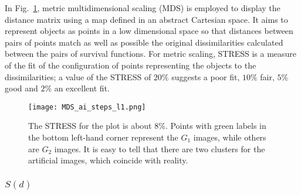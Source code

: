       
      In Fig.~\ref{fig:MDS_ai_steps_l1}, metric multidimensional
      scaling (MDS) \cite{borg2005modern} \cite{scikit-learn} is
      employed to display the distance matrix using a map defined in
      an abstract Cartesian space. It aims to represent objects as
      points in a low dimensional space so that distances between
      pairs of points match as well as possible the original
      dissimilarities calculated between the pairs of survival
      functions. For metric scaling, STRESS is a measure of the fit of
      the configuration of points representing the objects to the
      dissimilarities; a value of the STRESS of $20\%$ suggests a poor
      fit, $10\%$ fair, $5\%$ good and $2\%$ an excellent fit.

      \begin{figure}
        \centering
        \texttt{[image: MDS\_ai\_steps\_l1.png]}
        \caption{The STRESS for the plot is about $8\%$. Points with
          green labels in the bottom left-hand corner represent the
          $G_1$ images, while others are $G_2$ images. It is easy to
          tell that there are two clusters for the artificial images,
          which coincide with reality.}
        \label{fig:MDS_ai_steps_l1}
      \end{figure}
      



       



       


























      




       \newpage

       
      \subsubsection{$S(d)$}



